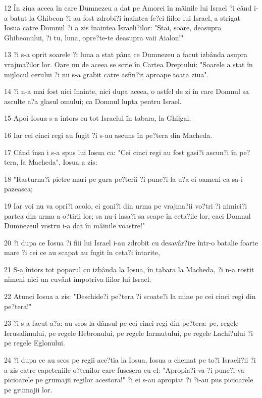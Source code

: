 \par 12 În ziua aceea în care Dumnezeu a dat pe Amorei în mâinile lui Israel ?i când i-a batut la Ghibeon ?i au fost zdrobi?i înaintea fe?ei fiilor lui Israel, a strigat Iosua catre Domnul ?i a zis înaintea Israeli?ilor: "Stai, soare, deasupra Ghibeonului, ?i tu, luna, opre?te-te deasupra vaii Aialon!"
\par 13 ?i s-a oprit soarele ?i luna a stat pâna ce Dumnezeu a facut izbânda asupra vrajma?ilor lor. Oare nu de aceea se scrie în Cartea Dreptului: "Soarele a stat în mijlocul cerului ?i nu s-a grabit catre asfin?it aproape toata ziua".
\par 14 ?i n-a mai fost nici înainte, nici dupa aceea, o astfel de zi în care Domnul sa asculte a?a glasul omului; ca Domnul lupta pentru Israel.
\par 15 Apoi Iosua s-a întors cu tot Israelul în tabara, la Ghilgal.
\par 16 Iar cei cinci regi au fugit ?i s-au ascuns în pe?tera din Macheda.
\par 17 Când însa i s-a spus lui Iosua ca: "Cei cinci regi au fost gasi?i ascun?i în pe?tera, la Macheda", Iosua a zis:
\par 18 "Rasturna?i pietre mari pe gura pe?terii ?i pune?i la u?a ei oameni ca sa-i pazeasca;
\par 19 Iar voi nu va opri?i acolo, ci goni?i din urma pe vrajma?ii vo?tri ?i nimici?i partea din urma a o?tirii lor; sa nu-i lasa?i sa scape în ceta?ile lor, caci Domnul Dumnezeul vostru i-a dat în mâinile voastre!"
\par 20 ?i dupa ce Iosua ?i fiii lui Israel i-au zdrobit cu desavâr?ire într-o batalie foarte mare ?i cei ce au scapat au fugit în ceta?i întarite,
\par 21 S-a întors tot poporul cu izbânda la Iosua, în tabara la Macheda, ?i n-a rostit nimeni nici un cuvânt împotriva fiilor lui Israel.
\par 22 Atunci Iosua a zis: "Deschide?i pe?tera ?i scoate?i la mine pe cei cinci regi din pe?tera!"
\par 23 ?i s-a facut a?a: au scos la dânsul pe cei cinci regi din pe?tera: pe, regele Ierusalimului, pe regele Hebronului, pe regele Iarmutului, pe regele Lachi?ului ?i pe regele Eglonului.
\par 24 ?i dupa ce au scos pe regii ace?tia la Iosua, Iosua a chemat pe to?i Israeli?ii ?i a zis catre capeteniile o?tenilor care fusesera cu el: "Apropia?i-va ?i pune?i-va picioarele pe grumajii regilor acestora!" ?i ei s-au apropiat ?i ?i-au pus picioarele pe grumajii lor.
